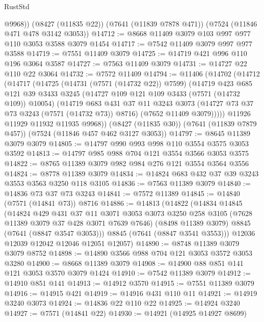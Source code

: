 \begin{lexlean}{RustStd}
\begin{coremodule}
        @9968))
    (@8427 (@11835 @22))
    (@7641 (@11839 @7878 @471))
    (@7524 (@11846 @471 @478 @3142 @3053))
@14712 := @8668 @11409 @3079 @103 @997 @977 @110 @3053 @3588 @3079 @1454
@14717 := @7542 @11409 @3079 @997 @977 @3588
@14719 := @7551 @11409 @3079
@14725 := @14719 @421 @996 @110 @196 @3064 @3587
@14727 := @7563 @11409 @3079
@14731 := @14727 @22 @110 @22 @3064
@14732 := @7572 @11409
@14794 := @11406
    (@14702
      (@14712
        (@14717
          (@14725
            (@14731 (@7571 (@14732 @22)) @7599)
            (@14719
              @423
              @685
              @121
              @39
              @3433
              @3245
              (@14727 @109 @121 @109 @3433 (@7571 (@14732 @109)) @10054)
              (@14719
                @683
                @431
                @37
                @11
                @3243
                @3073
                (@14727 @73 @37 @73 @3243 (@7571 (@14732 @73)) @8716)
                (@7652 @11409 @3079)))))
        @11926
        @11929
        @11932
        @11935
        @9968))
    (@8427 (@11835 @30))
    (@7641 (@11839 @7879 @457))
    (@7524 (@11846 @457 @462 @3127 @3053))
@14797 := @8645 @11389 @3079 @3079
@14805 := @14797 @990 @993 @998 @110 @3554 @3575 @3053 @3592
@14813 := @14797 @985 @988 @704 @121 @3554 @3566 @3053 @3575
@14822 := @8765 @11389 @3079 @982 @984 @276 @121 @3554 @3564 @3556
@14824 := @8778 @11389 @3079
@14834 := @14824 @683 @432 @37 @39 @3243 @3553 @3563 @3250 @118 @3105
@14836 := @7563 @11389 @3079
@14840 := @14836 @73 @37 @73 @3243
@14841 := @7572 @11389
@14845 := @14840 (@7571 (@14841 @73)) @8716
@14886 := @14813
    (@14822
      (@14834
        @14845
        (@14824
          @429
          @431
          @37
          @11
          @3071
          @3053
          @3073
          @3250
          @258
          @3105
          (@7628 @11389 @3079 @37 @428 @3071 @7639 @7646)
          (@8498 @11389 @3079)
          @8845
          (@7641 (@8847 @3547 @3053)))
        @8845
        (@7641 (@8847 @3541 @3553)))
      @12036
      @12039
      @12042
      @12046
      @12051
      @12057)
@14890 := @8748 @11389 @3079 @3079 @8752
@14898 := @14890 @3566 @988 @704 @121 @3053 @3572 @3053 @3280
@14900 := @8668 @11389 @3079
@14908 := @14900 @88 @851 @141 @121 @3053 @3570 @3079 @1424
@14910 := @7542 @11389 @3079
@14912 := @14910 @851 @141
@14913 := @14912 @3570
@14915 := @7551 @11389 @3079
@14916 := @14915 @421
@14919 := @14916 @431 @110 @11
@14921 := @14919 @3240 @3073
@14924 := @14836 @22 @110 @22
@14925 := @14924 @3240
@14927 := @7571 (@14841 @22)
@14930 := @14921 (@14925 @14927 @8699)

\end{coremodule}
\end{lexlean}
